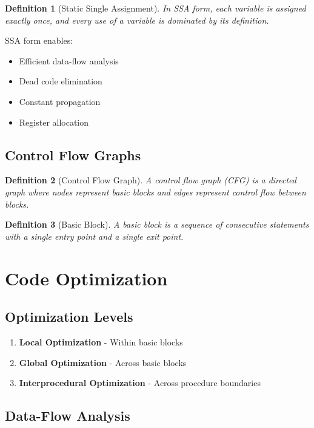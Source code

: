 \documentclass[11pt]{article}
\newtheorem{definition}{Definition}[section]
\begin{document}
\begin{definition}[Static Single Assignment]
In SSA form, each variable is assigned exactly once, and every use of a variable is dominated by its definition.
\end{definition}

SSA form enables:
\begin{itemize}
    \item Efficient data-flow analysis
    \item Dead code elimination
    \item Constant propagation
    \item Register allocation
\end{itemize}

\subsection{Control Flow Graphs}

\begin{definition}[Control Flow Graph]
A control flow graph (CFG) is a directed graph where nodes represent basic blocks and edges represent control flow between blocks.
\end{definition}

\begin{definition}[Basic Block]
A basic block is a sequence of consecutive statements with a single entry point and a single exit point.
\end{definition}

\section{Code Optimization}

\subsection{Optimization Levels}

\begin{enumerate}
    \item \textbf{Local Optimization} - Within basic blocks
    \item \textbf{Global Optimization} - Across basic blocks
    \item \textbf{Interprocedural Optimization} - Across procedure boundaries
\end{enumerate}

\subsection{Data-Flow Analysis}
\end{document}
